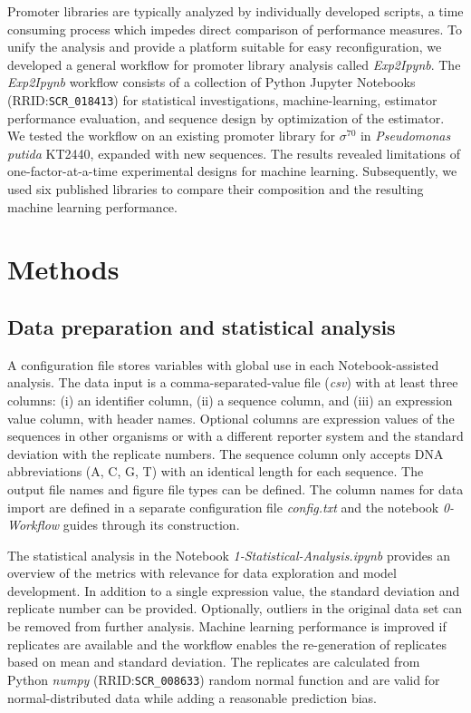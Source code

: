 \documentclass[utf8]{frontiersSCNS} %
\begin{document}
Promoter libraries are typically analyzed by individually developed scripts, a time consuming process which impedes direct comparison of performance measures. To unify the analysis and provide a platform suitable for easy reconfiguration, we developed a general workflow for promoter library analysis called \textit{Exp2Ipynb}. The \textit{Exp2Ipynb} workflow consists of a collection of Python Jupyter Notebooks (RRID:\verb:SCR_018413:) for statistical investigations, machine-learning, estimator performance evaluation, and sequence design by optimization of the estimator. We tested the workflow on an existing promoter library for $\sigma^{\mathrm{70}}$ in \textit{Pseudomonas putida} KT2440, expanded with new sequences. The results revealed limitations of one-factor-at-a-time experimental designs for machine learning. Subsequently, we used six published libraries to compare their composition and the resulting machine learning performance.


\section{Methods}
\subsection{Data preparation and statistical analysis}  
A configuration file stores variables with global use in each Notebook-assisted analysis. The data input is a comma-separated-value file (\textit{csv}) with at least three columns: (i) an identifier column, (ii) a sequence column, and (iii) an expression value column, with header names. Optional columns are expression values of the sequences in other organisms or with a different reporter system and the standard deviation with the replicate numbers. The sequence column only accepts DNA abbreviations (A, C, G, T) with an identical length for each sequence. The output file names and figure file types can be defined. The column names for data import are defined in a separate configuration file \textit{config.txt} and the notebook \textit{0-Workflow} guides through its construction. 

The statistical analysis in the Notebook \textit{1-Statistical-Analysis.ipynb} provides an overview of the metrics with relevance for data exploration and model development. In addition to a single expression value, the standard deviation and replicate number can be provided. Optionally, outliers in the original data set can be removed from further analysis. Machine learning performance is improved if replicates are available and the workflow enables the re-generation of replicates based on mean and standard deviation. The replicates are calculated from Python \textit{numpy} (RRID:\verb:SCR_008633:) random normal function \citep{Harris2020} and are valid for normal-distributed data while adding a reasonable prediction bias.   
\end{document}

